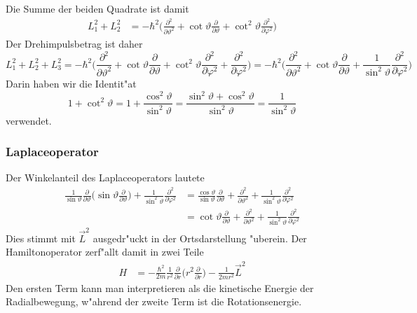 Die Summe der beiden Quadrate ist damit
\begin{align*}
L_1^2+L_2^2
&=
-\hbar^2\biggl(
\frac{\partial^2}{\partial\vartheta^2}
+
\cot\vartheta\frac{\partial}{\partial\vartheta}
+
\cot^2\vartheta\frac{\partial^2}{\partial\varphi^2}
\biggr)
\end{align*}
Der Drehimpulsbetrag ist daher
\[
L_1^2+L_2^2+L_3^2
=
-\hbar^2\biggl(
\frac{\partial^2}{\partial\vartheta^2}
+
\cot\vartheta\frac{\partial}{\partial\vartheta}
+
\cot^2\vartheta\frac{\partial^2}{\partial\varphi^2}
+
\frac{\partial^2}{\partial\varphi^2}
\biggr)
=
-\hbar^2\biggl(
\frac{\partial^2}{\partial\vartheta^2}
+
\cot\vartheta\frac{\partial}{\partial\vartheta}
+
\frac1{\sin^2\vartheta}\frac{\partial^2}{\partial\varphi^2}
\biggr)
\]
Darin haben wir die Identit"at
\[
1+\cot^2\vartheta
=
1+\frac{\cos^2\vartheta}{\sin^2\vartheta}
=
\frac{\sin^2\vartheta+\cos^2\vartheta}{\sin^2\vartheta}
=
\frac{1}{\sin^2\vartheta}
\]
verwendet.

\subsubsection{Laplaceoperator}
Der Winkelanteil des Laplaceoperators lautete
\begin{align*}
\frac1{\sin\vartheta}\frac{\partial}{\partial\vartheta}\biggl(
\sin\vartheta\frac{\partial}{\partial\vartheta}
\biggr)
+\frac1{\sin^2\vartheta}\frac{\partial^2}{\partial\varphi^2}
&=
\frac{\cos\vartheta}{\sin\vartheta}\frac{\partial}{\partial\vartheta}
+
\frac{\partial^2}{\partial\vartheta^2}
+
\frac{1}{\sin^2\vartheta}\frac{\partial^2}{\partial\varphi^2}
\\
&=
\cot\vartheta\frac{\partial}{\partial\vartheta}
+
\frac{\partial^2}{\partial\vartheta^2}
+
\frac{1}{\sin^2\vartheta}\frac{\partial^2}{\partial\varphi^2}
\end{align*}
Dies stimmt mit $\vec L^2$ ausgedr"uckt in der Ortsdarstellung "uberein.
Der Hamiltonoperator zerf"allt damit in zwei Teile
\begin{align*}
H
&=-\frac{\hbar^2}{2m}
\frac1{r^2}\frac{\partial}{\partial r}\biggl(r^2\frac{\partial}{\partial r}\biggr)
-\frac{1}{2mr^2}\vec L^2
\end{align*}
Den ersten Term kann man interpretieren als die kinetische Energie
der Radialbewegung, w"ahrend der zweite Term ist die Rotationsenergie.

